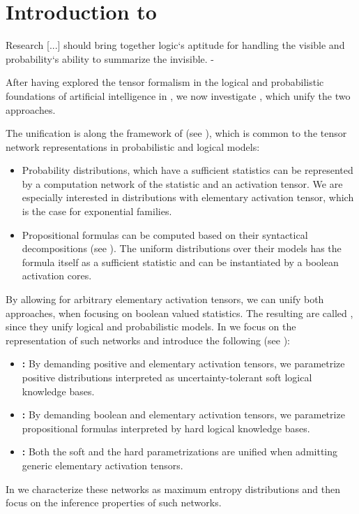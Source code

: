 \chapter{Introduction to }

\begin{highlight}
	Research [...] should bring together logic`s aptitude for handling the visible and probability`s ability to summarize the invisible. - 
\end{highlight}

After having explored the tensor formalism in the logical and probabilistic foundations of artificial intelligence in , we now investigate \HybridLogicNetworks{}, which unify the two approaches.


The unification is along the framework of \ComputationActivationNetworks{} (see ), which is common to the tensor network representations in probabilistic and logical models:
\begin{itemize}
    \item Probability distributions, which have a sufficient statistics can be represented by a computation network of the statistic and an activation tensor.
    We are especially interested in distributions with elementary activation tensor, which is the case for exponential families.
    \item Propositional formulas can be computed based on their syntactical decompositions (see ).
    The uniform distributions over their models has the formula itself as a sufficient statistic and can be instantiated by a boolean activation cores.
\end{itemize}
By allowing for arbitrary elementary activation tensors, we can unify both approaches, when focusing on boolean valued statistics.
The resulting \ComputationActivationNetworks{} are called \HybridLogicNetworks{}, since they unify logical and probabilistic models.
In  we focus on the representation of such networks and introduce the following (see ):
\begin{itemize}
    \item \textbf{\MarkovLogicNetworks{}:} By demanding positive and elementary activation tensors, we parametrize positive distributions interpreted as uncertainty-tolerant soft logical knowledge bases.
    \item \textbf{\HardLogicNetworks{}:} By demanding boolean and elementary activation tensors, we parametrize propositional formulas interpreted by hard logical knowledge bases.
    \item \textbf{\HybridLogicNetworks{}:} Both the soft and the hard parametrizations are unified when admitting generic elementary activation tensors.
\end{itemize}
In  we characterize these networks as maximum entropy distributions and then focus on the inference properties of such networks.

